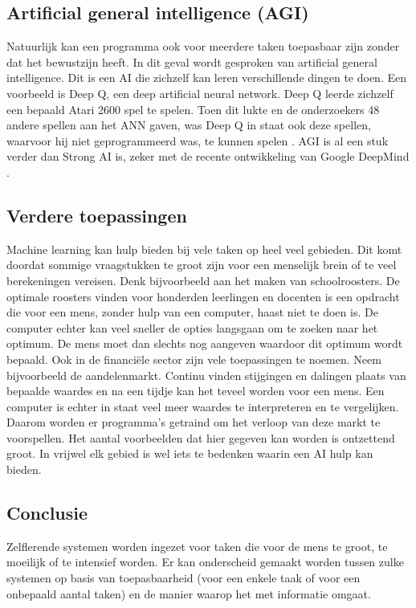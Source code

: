 \subsection{Artificial general intelligence (AGI)}
Natuurlijk kan een programma ook voor meerdere taken toepasbaar zijn zonder dat het bewustzijn heeft. In dit geval wordt gesproken van artificial general intelligence. Dit is een AI die zichzelf kan leren verschillende dingen te doen. Een voorbeeld is Deep Q, een deep artificial neural network. Deep Q leerde zichzelf een bepaald Atari 2600 spel te spelen. Toen dit lukte en de onderzoekers 48 andere spellen aan het ANN gaven, was Deep Q in staat ook deze spellen, waarvoor hij niet geprogrammeerd was, te kunnen spelen \cite{DeepQ}.
AGI is al een stuk verder dan Strong AI is, zeker met de recente ontwikkeling van Google DeepMind \cite{DeepMind1}.

\subsection{Verdere toepassingen}
Machine learning kan hulp bieden bij vele taken op heel veel gebieden. Dit komt doordat sommige vraagstukken te groot zijn voor een menselijk brein of te veel berekeningen vereisen. Denk bijvoorbeeld aan het maken van schoolroosters. De optimale roosters vinden voor honderden leerlingen en docenten is een opdracht die voor een mens, zonder hulp van een computer, haast niet te doen is. De computer echter kan veel sneller de opties langsgaan om te zoeken naar het optimum. De mens moet dan slechts nog aangeven waardoor dit optimum wordt bepaald.
Ook in de financi\"{e}le sector zijn vele toepassingen te noemen. Neem bijvoorbeeld de aandelenmarkt. Continu vinden stijgingen en dalingen plaats van bepaalde waardes en na een tijdje kan het teveel worden voor een mens. Een computer is echter in staat veel meer waardes te interpreteren en te vergelijken. Daarom worden er programma's getraind om het verloop van deze markt te voorspellen.
Het aantal voorbeelden dat hier gegeven kan worden is ontzettend groot. In vrijwel elk gebied is wel iets te bedenken waarin een AI hulp kan bieden.

\subsection{Conclusie}
Zelflerende systemen worden ingezet voor taken die voor de mens te groot, te moeilijk of te intensief worden. Er kan onderscheid gemaakt worden tussen zulke systemen op basis van toepasbaarheid (voor een enkele taak of voor een onbepaald aantal taken) en de manier waarop het met informatie omgaat.